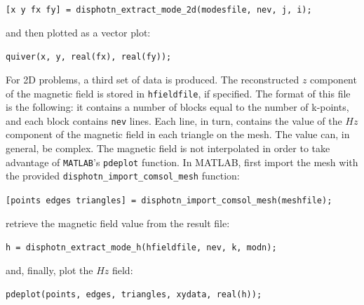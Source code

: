 \documentclass[11pt,a4paper,oneside]{article}
\begin{document}
{\tt [x y fx fy] = disphotn\_extract\_mode\_2d(modesfile,\ nev,\ j,\ i);}

\noindent
and then plotted as a vector plot:

{\tt quiver(x,\ y,\ real(fx),\ real(fy));}

\noindent
For 2D problems, a third set of data is produced. The reconstructed $z$ component of the magnetic field is stored in {\tt hfieldfile}, if specified. The format of this file is the following: it contains a number of blocks equal to the number of k-points, and each block contains {\tt nev} lines. Each line, in turn, contains the value of the $Hz$ component of the magnetic field in each triangle on the mesh. The value can, in general, be complex. The magnetic field is not interpolated in order to take advantage of {\tt MATLAB}'s {\tt pdeplot} function. In MATLAB, first import the mesh with the provided {\tt disphotn\_import\_comsol\_mesh} function:

{\tt [points\ edges\ triangles] =  disphotn\_import\_comsol\_mesh(meshfile);}

\noindent
retrieve the magnetic field value from the result file:

{\tt h = disphotn\_extract\_mode\_h(hfieldfile, nev, k, modn);}

\noindent
and, finally, plot the $Hz$ field:

{\tt pdeplot(points,\ edges,\ triangles,\ xydata,\ real(h));}
\end{document}
